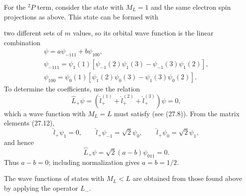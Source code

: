 For the ${}^2P$ term, consider the state with $M_L=1$ and the same electron spin projections as above. This state can be formed with

two different sets of $m$ values, so its orbital wave function is the linear combination
\[
\begin{gathered}
\psi=a\psi_{-111}+b\psi_{100},\\
\psi_{-111}=\psi_1(1)[\psi_{-1}(2)\psi_1(3)-\psi_{-1}(3)\psi_1(2)],\\
\psi_{100}=\psi_0(1)[\psi_1(2)\psi_0(3)-\psi_1(3)\psi_0(2)].
\end{gathered}
\]
To determine the coefficients, use the relation
\[
\hat L_+\psi=(\hat l_+^{(1)}+\hat l_+^{(2)}+\hat l_+^{(3)})\psi=0,
\]
which a wave function with $M_L=L$ must satisfy (see (27.8)). From the matrix elements (27.12),
\[
\hat l_+\psi_1=0,\qquad \hat l_+\psi_{-1}=\sqrt2\psi_0,\qquad
\hat l_+\psi_0=\sqrt2\psi_1,
\]
and hence
\[
\hat L_+\psi=\sqrt2(a-b)\psi_{011}=0.
\]
Thus $a-b=0$; including normalization gives $a=b=1/2$.

The wave functions of states with $M_L<L$ are obtained from those found above by applying the operator $\hat L_-$.
